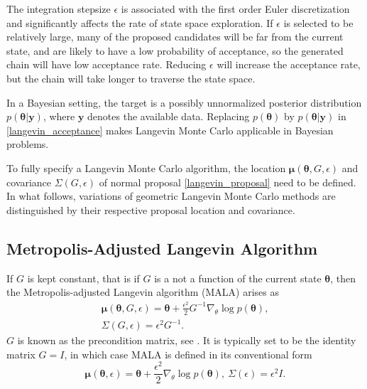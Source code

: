 \documentclass[twoside,11pt]{article}
\begin{document}
The integration stepsize $\epsilon$ is associated with the first order Euler discretization and significantly affects the 
rate of state space exploration. If $\epsilon$ is selected to be relatively large, many of the proposed candidates will be far from 
the current state, and are likely to have a low probability of acceptance, so the generated chain will have low acceptance 
rate. Reducing $\epsilon$ will increase the acceptance rate, but the chain will take longer to traverse the state space.

In a Bayesian setting, the target is a possibly unnormalized posterior distribution $p(\boldsymbol{\theta}|\mathbf{y})$,
where $\mathbf{y}$ denotes the available data. Replacing $p(\boldsymbol{\theta})$ by $p(\boldsymbol{\theta}|\mathbf{y})$ in
\eqref{langevin_acceptance} makes Langevin Monte Carlo applicable in Bayesian problems.

To fully specify a Langevin Monte Carlo algorithm, the location $\boldsymbol{\mu}(\boldsymbol{\theta}, G, \epsilon)$ and 
covariance $\Sigma(G, \epsilon)$ of normal proposal \eqref{langevin_proposal} need to be defined. In what follows, 
variations of geometric Langevin Monte Carlo methods are distinguished by their respective proposal location and covariance.

\subsection{Metropolis-Adjusted Langevin Algorithm}
\label{mala_section}

If $G$ is kept constant, that is if $G$ is a not a function of the current state $\boldsymbol{\theta}$, then the
Metropolis-adjusted Langevin algorithm (MALA) arises as
\begin{eqnarray}
\label{mala_location}
\boldsymbol{\mu}(\boldsymbol{\theta}, G, \epsilon) = 
\boldsymbol{\theta}+\frac{\epsilon^2}{2}G^{-1}\nabla_{\theta}\log{p(\boldsymbol{\theta})},\\
\label{mala_covariance}
\Sigma(G, \epsilon) = \epsilon^2 G^{-1}.
\end{eqnarray}
$G$ is known as the precondition matrix, see \cite{rob_stra__lan}. It is typically set to be the identity matrix $G=I$, in
which case MALA is defined in its conventional form
\begin{equation}
\label{mala_location_covariance_identity}
\boldsymbol{\mu}(\boldsymbol{\theta}, \epsilon) = 
\boldsymbol{\theta}+\frac{\epsilon^2}{2}\nabla_{\theta}\log{p(\boldsymbol{\theta})},~
\Sigma(\epsilon) = \epsilon^2 I.
\end{equation}
\end{document}
